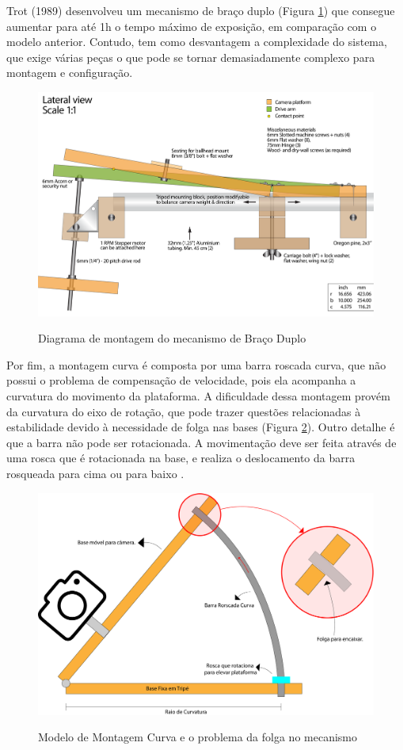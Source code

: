 Trot (1989) desenvolveu um mecanismo de braço duplo (Figura \ref{fig:doublearm}) que consegue aumentar para até 1h o tempo máximo de exposição, em comparação com o modelo anterior. Contudo, tem como desvantagem a complexidade do sistema, que exige várias peças o que pode se tornar demasiadamente complexo para montagem e configuração.

\begin{figure}[!htb]
	\centering
	\caption{Diagrama de montagem do mecanismo de Braço Duplo}
	\includegraphics[width=0.6\linewidth]{figuras/heavy-duty-double-arm-barndoor-building-plans-3}
	\label{fig:doublearm}
\end{figure}

Por fim, a montagem curva é composta por uma barra roscada curva, que não possui o problema de compensação de velocidade, pois ela acompanha a curvatura do movimento da plataforma. A dificuldade dessa montagem provém da curvatura do eixo de rotação, que pode trazer questões relacionadas à estabilidade devido à necessidade de folga nas bases (Figura \ref{fig:montagemCurva}). Outro detalhe é que a barra não pode ser rotacionada. A movimentação deve ser feita através de uma rosca que é rotacionada na base, e realiza o deslocamento da barra rosqueada para cima ou para baixo \cite{site:pentaxBarnDoor}.  

 
 \begin{figure}[!htb]
 	\centering
 	\caption[Modelo de Montagem Curva]{Modelo de Montagem Curva e o problema da folga no mecanismo}
 	\includegraphics[width=0.6\linewidth]{figuras/montagemCurva}
 	\label{fig:montagemCurva}
 \end{figure}

